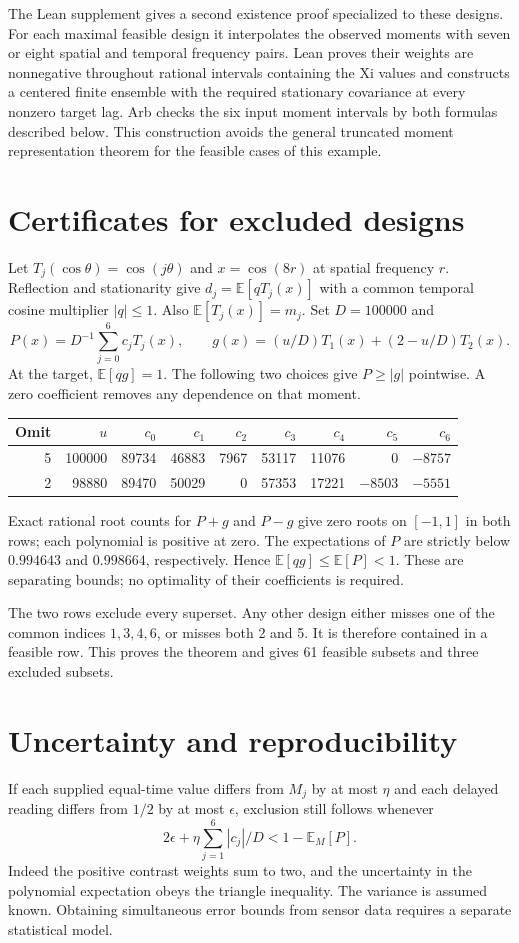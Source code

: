 \documentclass[11pt]{article}
\begin{document}
The Lean supplement gives a second existence proof specialized to these designs. For each maximal feasible design it interpolates the observed moments with seven or eight spatial and temporal frequency pairs. Lean proves their weights are nonnegative throughout rational intervals containing the Xi values and constructs a centered finite ensemble with the required stationary covariance at every nonzero target lag. Arb checks the six input moment intervals by both formulas described below. This construction avoids the general truncated moment representation theorem for the feasible cases of this example.

\section{Certificates for excluded designs}
Let $T_j(\cos\theta)=\cos(j\theta)$ and $x=\cos(8r)$ at spatial frequency $r$. Reflection and stationarity give $d_j=\mathbb E[q T_j(x)]$ with a common temporal cosine multiplier $|q|\le1$. Also $\mathbb E[T_j(x)]=m_j$. Set $D=100000$ and
\[
 P(x)=D^{-1}\sum_{j=0}^6 c_j T_j(x),\qquad
 g(x)=(u/D)T_1(x)+(2-u/D)T_2(x).
\]
At the target, $\mathbb E[qg]=1$. The following two choices give $P\ge|g|$ pointwise. A zero coefficient removes any dependence on that moment.
\begin{center}\small
\begin{tabular}{rrrrrrrrr}\toprule
Omit &$u$ &$c_0$ &$c_1$ &$c_2$ &$c_3$ &$c_4$ &$c_5$ &$c_6$\\\midrule
5&100000&89734&46883&7967&53117&11076&0&$-8757$\\
2&98880&89470&50029&0&57353&17221&$-8503$&$-5551$\\\bottomrule
\end{tabular}
\end{center}
Exact rational root counts for $P+g$ and $P-g$ give zero roots on $[-1,1]$ in both rows; each polynomial is positive at zero. The expectations of $P$ are strictly below $0.994643$ and $0.998664$, respectively. Hence $\mathbb E[qg]\le\mathbb E[P]<1$. These are separating bounds; no optimality of their coefficients is required.

The two rows exclude every superset. Any other design either misses one of the common indices $1,3,4,6$, or misses both 2 and 5. It is therefore contained in a feasible row. This proves the theorem and gives 61 feasible subsets and three excluded subsets.

\section{Uncertainty and reproducibility}
If each supplied equal-time value differs from $M_j$ by at most $\eta$ and each delayed reading differs from $1/2$ by at most $\epsilon$, exclusion still follows whenever
\[
 2\epsilon + \eta\sum_{j=1}^6 |c_j|/D < 1-\mathbb E_M[P].
\]
Indeed the positive contrast weights sum to two, and the uncertainty in the polynomial expectation obeys the triangle inequality. The variance is assumed known. Obtaining simultaneous error bounds from sensor data requires a separate statistical model.
\end{document}
